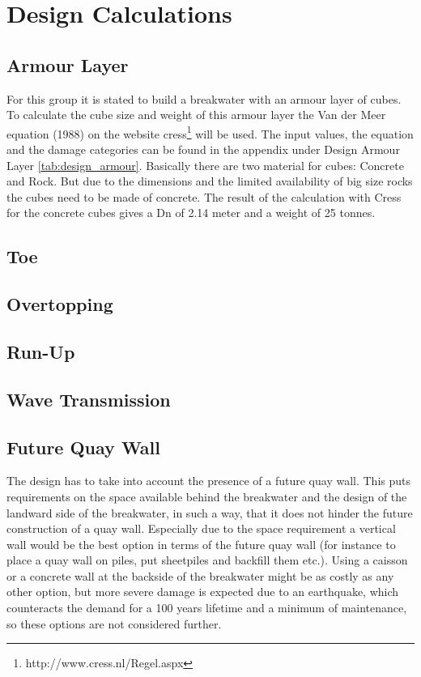 \chapter{Design Calculations}

\section{Armour Layer}
For this group it is stated to build a breakwater with an armour layer of cubes. To calculate the cube size and weight of this armour layer the Van der Meer equation (1988) on the website cress\footnote{http://www.cress.nl/Regel.aspx} will be used. The input values, the equation and the damage categories can be found in the appendix under Design Armour Layer \ref{tab:design_armour}. Basically there are two material for cubes: Concrete and Rock. But due to the dimensions and the limited availability of big size rocks the cubes need to be made of concrete. The result of the calculation with Cress for the concrete cubes gives a Dn of 2.14 meter and a weight of 25 tonnes.
\section{Toe}

\section{Overtopping}

\section{Run-Up}

\section{Wave Transmission}

\section{Future Quay Wall}
The design has to take into account the presence of a future quay wall.
This puts requirements on the space available behind the breakwater and the design of the landward side of the breakwater, in such a way, that it does not hinder the future construction of a quay wall.
Especially due to the space requirement a vertical wall would be the best option in terms of the future quay wall (for instance to place a quay wall on piles, put sheetpiles and backfill them etc.).
Using a caisson or a concrete wall at the backside of the breakwater might be as costly as any other option, but more severe damage is expected due to an earthquake, which counteracts the demand for a 100 years lifetime and a minimum of maintenance, so these options are not considered further.
